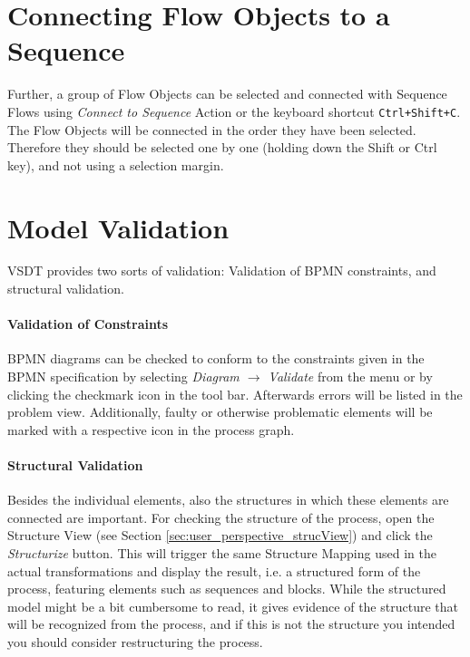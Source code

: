 \section{Connecting Flow Objects to a Sequence}
Further, a group of Flow Objects can be selected and connected with Sequence Flows
using \emph{Connect to Sequence} Action or the keyboard shortcut \texttt{Ctrl+Shift+C}.
The Flow Objects will be connected in the order they have been selected.  Therefore
they should be selected one by one (holding down the Shift or Ctrl key), and not
using a selection margin.



\section{Model Validation}
\label{sec:user_features_validate}

VSDT provides two sorts of validation: Validation of BPMN constraints, and
structural validation.

\paragraph{Validation of Constraints}
BPMN diagrams can be checked to conform to the constraints given in the BPMN
specification by selecting \emph{Diagram $\rightarrow$ Validate} from the menu or
by clicking the checkmark icon in the tool bar.  Afterwards errors will be listed
in the problem view.  Additionally, faulty or otherwise problematic elements will
be marked with a respective icon in the process graph.

\paragraph{Structural Validation}
Besides the individual elements, also the structures in which these elements are
connected are important.  For checking the structure of the process, open the
Structure View (see Section \ref{sec:user_perspective_strucView}) and click the
\emph{Structurize} button.  This will trigger the same Structure Mapping used in
the actual transformations and display the result, i.e. a structured form of the
process, featuring elements such as sequences and blocks.  While the structured
model might be a bit cumbersome to read, it gives evidence of the structure that
will be recognized from the process, and if this is not the structure you intended
you should consider restructuring the process.


